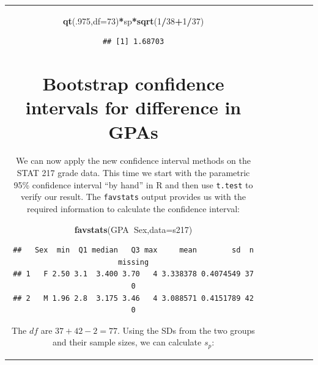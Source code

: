 \documentclass[]{book}
\newenvironment{Shaded}{\begin{snugshade}}{\end{snugshade}}
\newcommand{\KeywordTok}[1]{\textcolor[rgb]{0.13,0.29,0.53}{\textbf{#1}}}
\newcommand{\DataTypeTok}[1]{\textcolor[rgb]{0.13,0.29,0.53}{#1}}
\newcommand{\DecValTok}[1]{\textcolor[rgb]{0.00,0.00,0.81}{#1}}
\newcommand{\OperatorTok}[1]{\textcolor[rgb]{0.81,0.36,0.00}{\textbf{#1}}}
\newcommand{\NormalTok}[1]{#1}
\theoremstyle{definition}
\theoremstyle{definition}
\theoremstyle{remark}
\begin{document}
\begin{longtable}[]{@{}ccccccc@{}}
\begin{minipage}[b]{0.10\columnwidth}
\begin{Shaded}
\begin{Highlighting}[]
\begin{Shaded}
\begin{Highlighting}[]
\begin{Shaded}
\begin{Highlighting}[]
\begin{Shaded}
\begin{Highlighting}[]
\begin{Shaded}
\begin{Highlighting}[]
\KeywordTok{qt}\NormalTok{(.}\DecValTok{975}\NormalTok{,}\DataTypeTok{df=}\DecValTok{73}\NormalTok{)}\OperatorTok{*}\NormalTok{sp}\OperatorTok{*}\KeywordTok{sqrt}\NormalTok{(}\DecValTok{1}\OperatorTok{/}\DecValTok{38}\OperatorTok{+}\DecValTok{1}\OperatorTok{/}\DecValTok{37}\NormalTok{)}
\end{Highlighting}
\end{Shaded}

\begin{verbatim}
## [1] 1.68703
\end{verbatim}

\section{Bootstrap confidence intervals for difference in
GPAs}\label{section2-9}

We can now apply the new confidence interval methods on the STAT 217
grade data. This time we start with the parametric 95\% confidence
interval ``by hand'' in R and then use \texttt{t.test} to verify our
result. The \texttt{favstats} output provides us with the required
information to calculate the confidence interval:

\begin{Shaded}
\begin{Highlighting}[]
\KeywordTok{favstats}\NormalTok{(GPA}\OperatorTok{~}\NormalTok{Sex,}\DataTypeTok{data=}\NormalTok{s217)}
\end{Highlighting}
\end{Shaded}

\begin{verbatim}
##   Sex  min  Q1 median   Q3 max     mean        sd  n missing
## 1   F 2.50 3.1  3.400 3.70   4 3.338378 0.4074549 37       0
## 2   M 1.96 2.8  3.175 3.46   4 3.088571 0.4151789 42       0
\end{verbatim}

The \(df\) are \(37+42-2 = 77\). Using the SDs from the two groups and
their sample sizes, we can calculate \(s_p\):


\end{Highlighting}
\end{Shaded}
\end{Highlighting}
\end{Shaded}
\end{Highlighting}
\end{Shaded}
\end{Highlighting}
\end{Shaded}
\end{minipage}
\end{longtable}
\end{document}
